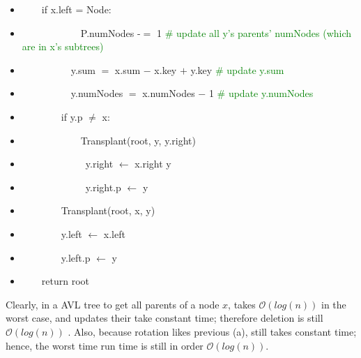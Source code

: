 \documentclass[11pt,twoside]{article}
\begin{document}
\begin{enumerate}[leftmargin=0pt]
\begin{enumerate}
\begin{itemize}  [label={}]
			\item \ \ \ \ if x.left = Node:
			\item  \ \ \ \ \ \ \ \ \ \ \ \ P.numNodes -$=$ 1  \textcolor{green} {\# update all y's parents' numNodes (which are in x's subtrees) }
			\item  \ \ \ \ \ \ \ \ \ \ y.sum $=$ x.sum $-$ x.key $+$ y.key \textcolor{green} {\# update  y.sum}
			\item  \ \ \ \ \ \ \ \ \ \ y.numNodes $=$ x.numNodes $-$ 1 \textcolor{green} {\# update  y.numNodes}
			\item \ \ \ \ \ \ \ \  if y.p $\neq$ x:
			\item  \ \ \ \ \ \ \ \ \ \ \ \  Transplant(root, y, y.right)
			\item \ \ \ \ \ \ \ \ \ \ \ \ \ y.right $\leftarrow$ x.right y 
			\item \ \ \ \ \ \ \ \ \ \ \ \ \ y.right.p $\leftarrow$ y
			\item \ \ \ \ \ \ \ \ Transplant(root, x, y)
			\item \ \ \ \ \ \ \ \ y.left $\leftarrow$ x.left
			\item \ \ \ \ \ \ \ \ y.left.p $\leftarrow$ y
			\item \ \ \ \ return root
		\end{itemize}
		Clearly, in a AVL tree to get all parents of a node $x$, takes $\mathcal{O}({log(n)})$ in the worst case, and updates their take constant time; therefore deletion is still $\mathcal{O}({log(n)})$ . Also, because rotation likes previous (a),  still takes constant time; hence, the worst time run time is still in order  $\mathcal{O}({log(n)})$.
	\end{enumerate}

\end{enumerate}
\end{document}
